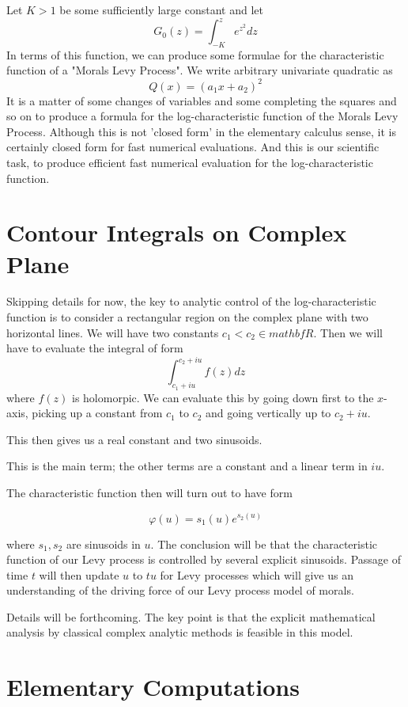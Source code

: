 \documentclass{amsart}
\begin{document}
Let $K>1$ be some sufficiently large constant and let
\[
G_0(z) = \int_{-K}^z e^{z^2} dz
\]
In terms of this function, we can produce some formulae for the characteristic function of a "Morals Levy Process". We write arbitrary univariate quadratic as
\[
Q(x) = (a_1 x + a_2)^2
\]
It is a matter of some changes of variables and some completing the squares and so on to produce a formula for the log-characteristic function of the Morals Levy Process.  Although this is not 'closed form' in the elementary calculus sense, it is certainly closed form for fast numerical evaluations.  And this is our scientific task, to produce efficient fast numerical evaluation for the log-characteristic function.

\section{Contour Integrals on Complex Plane}

Skipping details for now, the key to analytic control of the log-characteristic function is to consider a rectangular region on the complex plane with two horizontal lines.  We will have two constants $c_1 < c_2 \in mathbf{R}$. Then we will have to evaluate the integral of form
\[
\int_{c_1+iu}^{c_2+iu} f(z) dz
\]
where $f(z)$ is holomorpic.  We can evaluate this by going down first to the $x$-axis, picking up a constant from $c_1$ to $c_2$ and going vertically up to $c_2+iu$.

This then gives us a real constant and two sinusoids.

This is the main term; the other terms are a constant and a linear term in $iu$.

The characteristic function then will turn out to have form

\[
\varphi(u) = s_1(u)e^{s_2(u
)}
\]

where $s_1,s_2$ are sinusoids in $u$.  The conclusion will be that the characteristic function of our Levy process is controlled by several explicit sinusoids.  Passage of time $t$ will then update $u$ to $tu$ for Levy processes which will give us an understanding of the driving force of our Levy process model of morals.

Details will be forthcoming.  The key point is that the explicit mathematical analysis by classical complex analytic methods is feasible in this model.

\section{Elementary Computations}
\end{document}
